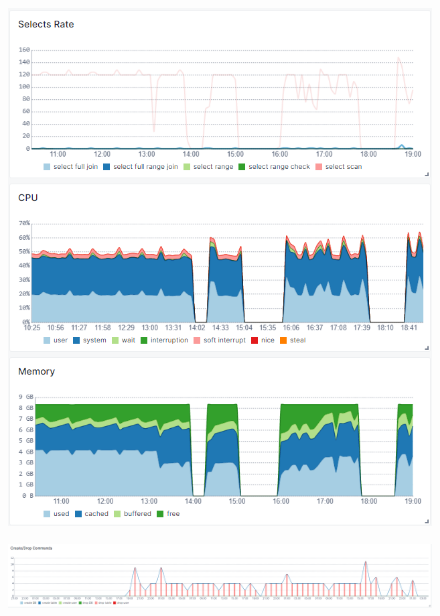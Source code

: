 \begin{figure}
    \centering
    \includegraphics[width=\textwidth]{figures/mysql_performance.png}
    \caption{}
    \label{fig:mysql_performance}
\end{figure}

\begin{figure}
    \centering
    \includegraphics[width=\textwidth]{figures/mysql_create_drop.png}
    \caption{}
    \label{fig:mysql_create_drop}
\end{figure}

